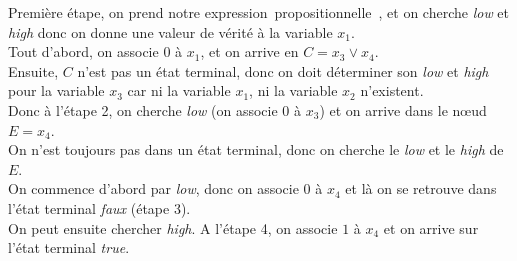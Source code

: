 \documentclass[a4paper, oneside]{report}
\newcommand{\expp}{expression~propositionnelle~}
\begin{document}
Première étape, on prend notre \expp, et on cherche \textit{low} et \textit{high} donc on donne une valeur de vérité à la variable $x_1$.\\
Tout d'abord, on associe $0$ à $x_1$, et on arrive en $C = x_3 \vee x_4  $.\\
Ensuite, $C$ n'est pas un état terminal, donc on doit déterminer son \textit{low} et \textit{high} pour la variable $x_3$ car ni la variable $x_1$, ni la variable $x_2$ n'existent.\\
Donc à l'étape 2, on cherche \textit{low} (on associe $0$ à $x_3$) et on arrive dans le nœud $E = x_4$.\\
On n'est toujours pas dans un état terminal, donc on cherche le \textit{low} et le \textit{high} de $E$.\\
On commence d'abord par \textit{low}, donc on associe $0$ à $x_4$ et là on se retrouve dans l'état terminal \textit{faux} (étape 3).\\
On peut ensuite chercher \textit{high}. A l'étape 4, on associe $1$ à $x_4$ et on arrive sur l'état terminal \textit{true}.
\newpage
\end{document}
